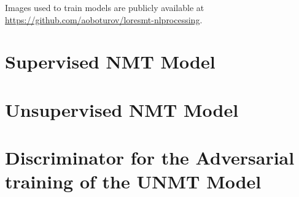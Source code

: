 \documentclass[]{article}
\begin{document}
Images used to train models are publicly available at \url{https://github.com/aoboturov/loresmt-nlprocessing}.

\small




\begin{appendices}
\section{Supervised NMT Model}
\label{appendix:supervised}


\section{Unsupervised NMT Model}
\label{appendix:unsupervised}


\section{Discriminator for the Adversarial training of the UNMT Model}
\label{appendix:discriminator}


\end{appendices}
\end{document}
